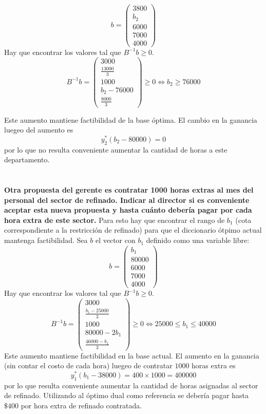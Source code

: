 \documentclass[10pt,a4paper]{article}
\begin{document}
$$
b = \begin{pmatrix}
	3800 \\
	b_2 \\
	6000 \\
	7000 \\
	4000
\end{pmatrix}
$$
Hay que encontrar los valores tal que $B^{-1}b \geq 0$.
$$
B^{-1}b = \begin{pmatrix}
	3000 \\
	\frac{13000}{3} \\
	1000 \\
	b_2 - 76000 \\
	\frac{8000}{3}
\end{pmatrix}  \geq 0 \iff b_2 \geq 76000
$$

Este aumento mantiene factibilidad de la base óptima. El cambio en la ganancia luegeo del aumento es 
$$y^*_2(b_2 - 80000) = 0$$ por lo que no resulta conveniente aumentar la cantidad de horas a este departamento.

\section{} %
\textbf{Otra propuesta del gerente es contratar 1000 horas extras al mes del personal del sector de refinado. Indicar al director si es conveniente aceptar esta nueva propuesta y hasta cuánto debería pagar por cada hora extra de este sector.}
Para esto hay que encontrar el rango de $b_1$ (cota correspondiente a la restricción de refinado) para que el diccionario ótpimo actual mantenga factibilidad. Sea $b$ el vector con $b_1$ definido como una variable libre:
$$
b = \begin{pmatrix}
	b_1 \\
	80000 \\
	6000 \\
	7000 \\
	4000
\end{pmatrix}
$$
Hay que encontrar los valores tal que $B^{-1}b \geq 0$.
$$
B^{-1}b = 
\begin{pmatrix}
	3000 \\
	\frac{b_1 - 25000}{3} \\
	1000 \\
	80000 - 2b_1 \\
	\frac{46000 - b_1}{3}
\end{pmatrix} \geq 0 \iff 25000 \leq b_1 \leq 40000
$$
Este aumento mantiene factibilidad en la base actual. El aumento en la ganancia (sin contar el costo de cada hora) luegeo de contratar $1000$ horas extra es $$y^*_1(b_1 - 38000) = 400 \times 1000 = 400000$$ 
por lo que resulta conveniente aumentar la cantidad de horas asignadas al sector de refinado. Utilizando al óptimo dual como referencia se debería pagar hasta $\$400$ por hora extra de refinado contratada.
\end{document}
